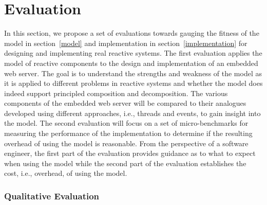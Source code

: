\chapter{Evaluation \label{evaluation}}

In this section, we propose a set of evaluations towards gauging the fitness of the model in section~\ref{model} and implementation in section~\ref{implementation} for designing and implementing real reactive systems.
The first evaluation applies the model of reactive components to the design and implementation of an embedded web server.
The goal is to understand the strengths and weakness of the model as it is applied to different problems in reactive systems and whether the model does indeed support principled composition and decomposition.
The various components of the embedded web server will be compared to their analogues developed using different approaches, i.e., threads and events, to gain insight into the model.
The second evaluation will focus on a set of micro-benchmarks for measuring the performance of the implementation to determine if the resulting overhead of using the model is reasonable.
From the perspective of a software engineer, the first part of the evaluation provides guidance as to what to expect when using the model while the second part of the evaluation establishes the cost, i.e., overhead, of using the model.

\subsection{Qualitative Evaluation}

